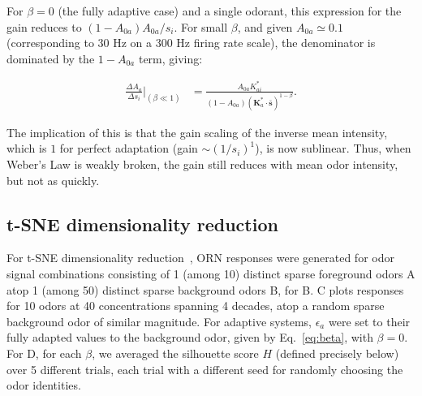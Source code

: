 \documentclass[9pt,lineno]{elife}
\begin{document}
{For $\beta = 0$ (the fully adaptive case) and a single odorant, this expression for the gain reduces to $(1 - A_{0a})A_{0a}/s_i$. For small $\beta$, and given $A_{0a} \simeq 0.1$ (corresponding to 30 Hz on a 300 Hz firing rate scale), the denominator is dominated by the $1 - A_{0a}$ term, giving:

\begin{align}
\frac{\Delta A_a}
{\Delta s_i}\bigg|_{(\beta \ll 1)}
&=\frac{A_{0a}K^*_{ai}}
{(1 - A_{0a})
	(\mathbf{K}^*_a\cdot 
	\bar {\mathbf{s}})^{1 - \beta}
}.
\end{align}

The implication of this is that the gain scaling of the inverse mean intensity, which is $1$ for perfect adaptation (gain $\sim (1/s_i)^1$), is now sublinear. Thus, when Weber's Law is weakly broken, the gain still reduces with mean odor intensity, but not as quickly. \\

}

\subsection{t-SNE dimensionality reduction} 



For t-SNE dimensionality reduction~\citep{tsne}, ORN responses were generated for odor signal combinations consisting of 1 (among 10) distinct sparse foreground odors A atop 1 (among 50) distinct sparse background odors B, for B.  C plots responses for 10 odors at 40 concentrations spanning 4 decades, atop a random sparse background odor of similar magnitude. For adaptive systems, $\epsilon_a$ were set to their fully adapted values to the background odor, given by Eq.~\ref{eq:beta}, with $\beta = 0$. For D, for each $\beta$, we averaged the silhouette score $H$ (defined precisely below) over 5 different trials, each trial with a different seed for randomly choosing the odor identities. 
\end{document}
